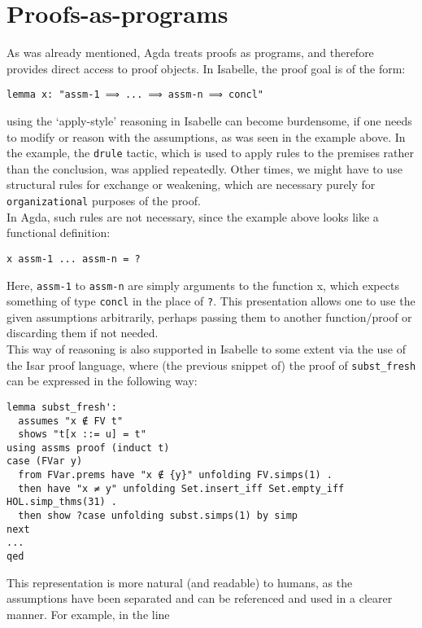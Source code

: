 \documentclass[a4paper, 12pt, twoside]{style/ociamthesis}
\theoremstyle{plain}
\theoremstyle{definition}
\theoremstyle{remark}
\begin{document}
\section{Proofs-as-programs}\label{proofs-as-programs}

As was already mentioned, Agda treats proofs as programs, and therefore
provides direct access to proof objects. In Isabelle, the proof goal is
of the form:

\begin{verbatim}
lemma x: "assm-1 ⟹ ... ⟹ assm-n ⟹ concl"
\end{verbatim}

using the `apply-style' reasoning in Isabelle can become burdensome, if
one needs to modify or reason with the assumptions, as was seen in the
example above. In the example, the \texttt{drule} tactic, which is used
to apply rules to the premises rather than the conclusion, was applied
repeatedly. Other times, we might have to use structural rules for
exchange or weakening, which are necessary purely for
\texttt{organizational} purposes of the proof.\\
In Agda, such rules are not necessary, since the example above looks
like a functional definition:

\begin{verbatim}
x assm-1 ... assm-n = ?
\end{verbatim}

Here, \texttt{assm-1} to \texttt{assm-n} are simply arguments to the
function x, which expects something of type \texttt{concl} in the place
of \texttt{?}. This presentation allows one to use the given assumptions
arbitrarily, perhaps passing them to another function/proof or
discarding them if not needed.\\
This way of reasoning is also supported in Isabelle to some extent via
the use of the Isar proof language, where (the previous snippet of) the
proof of \texttt{subst\_fresh} can be expressed in the following way:

\begin{verbatim}
lemma subst_fresh': 
  assumes "x ∉ FV t"
  shows "t[x ::= u] = t"
using assms proof (induct t)
case (FVar y)
  from FVar.prems have "x ∉ {y}" unfolding FV.simps(1) .
  then have "x ≠ y" unfolding Set.insert_iff Set.empty_iff HOL.simp_thms(31) .
  then show ?case unfolding subst.simps(1) by simp
next
...
qed
\end{verbatim}

This representation is more natural (and readable) to humans, as the
assumptions have been separated and can be referenced and used in a
clearer manner. For example, in the line
\end{document}
